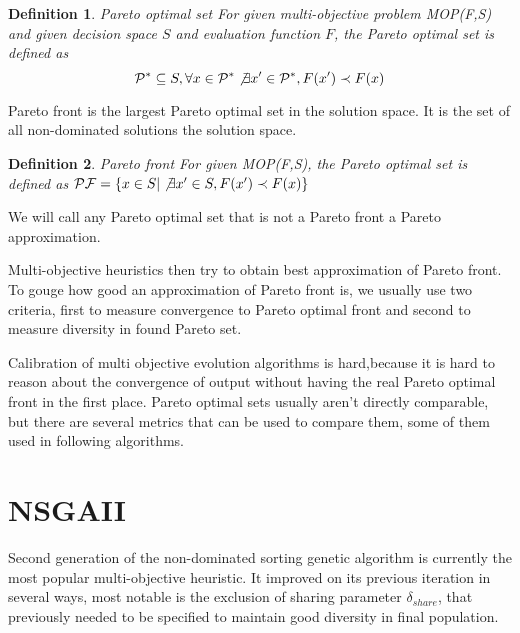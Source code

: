 \documentclass[12pt,oneside]{fithesis2}
\newtheorem{defn}{Definition}
\begin{document}
\begin{defn}{Pareto optimal set}
For given multi-objective problem MOP(F,S) and given decision space $S$ and evaluation function $F$, the Pareto optimal set is defined as 
$$ {\cal{P}^*} \subseteq S, \forall x \in {\cal{P}^*}  \not \exists x' \in {\cal{P}^*}, F(x') \prec F(x) $$
\end{defn}

Pareto front is the largest Pareto optimal set in the solution space. It is the set of all non-dominated solutions the solution space. 

\begin{defn}{Pareto front}
  For given MOP(F,S), the Pareto optimal set is defined as 
  ${\cal{PF}} = \{x \in S | \not \exists x' \in S, F(x') \prec F(x)\}$
\end{defn}

We will call any Pareto optimal set that is not a Pareto front a Pareto approximation.

Multi-objective heuristics then try to obtain best approximation of Pareto front. To gouge how good an approximation of Pareto front is, we usually use two criteria, first to measure convergence to Pareto optimal front and second to measure diversity in found Pareto set.

Calibration of multi objective evolution algorithms is hard,because it is hard to reason about the convergence of output without having the real Pareto optimal front in the first place. Pareto optimal sets usually aren't directly comparable, but there are several metrics that can be used to compare them, some of them used in following algorithms.  

\section{NSGAII}
Second generation of the non-dominated sorting genetic algorithm\cite{deb2002fast} is currently the most popular multi-objective heuristic. It improved on its previous iteration in several ways, most notable is the exclusion of sharing parameter $\delta_{share}$, that previously needed to be specified to maintain good diversity in final population.
\end{document}
